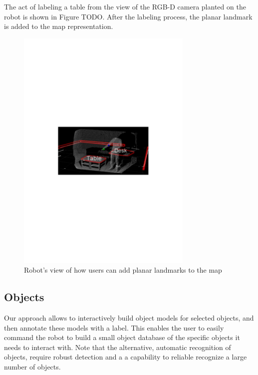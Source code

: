 \documentclass[12pt]{gatech-thesis}
\begin{document}
The act of labeling a table from the view of the RGB-D camera planted on the robot is shown in Figure TODO. After the labeling process, the planar landmark is added to the map representation.

\begin{figure}[ht!]
\centering
\includegraphics[width=0.75\textwidth]{pics/pointing_table_desk}
\caption{Robot's view of how users can add planar landmarks to the map}
\label{fig:pointing_table_desk}
\end{figure}

\subsection{Objects}
\label{sec:map_objects}

Our approach allows to interactively build object models for selected objects, and then annotate these models with a label. This enables the user to easily command the robot to build a small object database of the specific objects it needs to interact with. Note that the alternative, automatic recognition of objects, require robust detection and a a capability to reliable recognize a large number of objects.
\end{document}
